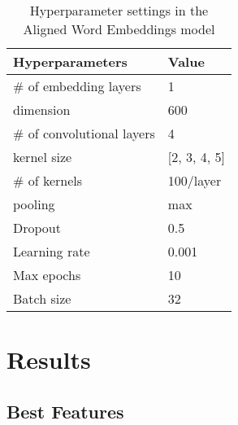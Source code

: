 \documentclass[11pt,a4paper]{article}
\begin{document}
\begin{table}[t]
  \begin{center}
  \begin{tabular}{|l|l|}
  \hline \bf Hyperparameters & \bf Value \\ \hline
  \# of embedding layers & 1 \\
  \hspace{0.5cm} dimension & 600 \\
  \# of convolutional layers & 4 \\
  \hspace{0.5cm} kernel size & [2, 3, 4, 5] \\
  \hspace{0.5cm} \# of kernels & 100/layer \\
  \hspace{0.5cm} pooling & max \\
  Dropout & 0.5 \\
  Learning rate & 0.001 \\
  Max epochs & 10 \\
  Batch size & 32 \\
  \hline
  \end{tabular}
  \end{center}
  \caption{\label{tab:cnn-hyperparams-table} Hyperparameter settings in the Aligned Word Embeddings model}
\end{table}

\section{Results}\label{sec:results}

\subsection{Best Features}
\end{document}
